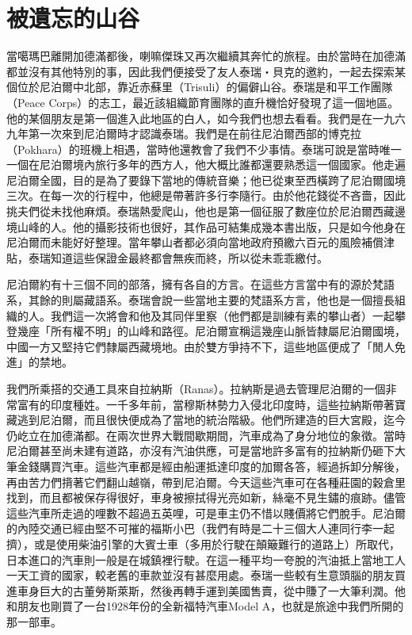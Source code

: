 \chapter{被遺忘的山谷}

當噶瑪巴離開加德滿都後，喇嘛傑珠又再次繼續其奔忙的旅程。由於當時在加德滿都並沒有其他特別的事，因此我們便接受了友人泰瑞‧貝克的邀約，一起去探索某個位於尼泊爾中北部，靠近赤蘇里（Trisuli）的偏僻山谷。泰瑞是和平工作團隊（Peace
Corps）的志工，最近該組織節育團隊的直升機恰好發現了這一個地區。他的某個朋友是第一個進入此地區的白人，如今我們也想去看看。我們是在一九六九年第一次來到尼泊爾時才認識泰瑞。我們是在前往尼泊爾西部的博克拉（Pokhara）的班機上相遇，當時他還教會了我們不少事情。泰瑞可說是當時唯一一個在尼泊爾境內旅行多年的西方人，他大概比誰都還要熟悉這一個國家。他走遍尼泊爾全國，目的是為了要錄下當地的傳統音樂；他已從東至西橫跨了尼泊爾國境三次。在每一次的行程中，他總是帶著許多行李隨行。由於他花錢從不吝嗇，因此挑夫們從未找他麻煩。泰瑞熱愛爬山，他也是第一個征服了數座位於尼泊爾西藏邊境山峰的人。他的攝影技術也很好，其作品可結集成幾本書出版，只是如今他身在尼泊爾而未能好好整理。當年攀山者都必須向當地政府預繳六百元的風險補償津貼，泰瑞知道這些保證金最終都會無疾而終，所以從未乖乖繳付。

尼泊爾約有十三個不同的部落，擁有各自的方言。在這些方言當中有的源於梵語系，其餘的則屬藏語系。泰瑞會說一些當地主要的梵語系方言，他也是一個擅長組織的人。我們這一次將會和他及其同伴里察（他們都是訓練有素的攀山者）一起攀登幾座「所有權不明」的山峰和路徑。尼泊爾宣稱這幾座山脈皆隸屬尼泊爾國境，中國一方又堅持它們隸屬西藏境地。由於雙方爭持不下，這些地區便成了「閒人免進」的禁地。


我們所乘搭的交通工具來自拉納斯（Ranas）。拉納斯是過去管理尼泊爾的一個非常富有的印度種姓。一千多年前，當穆斯林勢力入侵北印度時，這些拉納斯帶著寶藏逃到尼泊爾，而且很快便成為了當地的統治階級。他們所建造的巨大宮殿，迄今仍屹立在加德滿都。在兩次世界大戰間歇期間，汽車成為了身分地位的象徵。當時尼泊爾甚至尚未建有道路，亦沒有汽油供應，可是當地許多富有的拉納斯仍砸下大筆金錢購買汽車。這些汽車都是經由船運抵達印度的加爾各答，經過拆卸分解後，再由苦力們揹著它們翻山越嶺，帶到尼泊爾。今天這些汽車可在各種莊園的穀倉里找到，而且都被保存得很好，車身被擦拭得光亮如新，絲毫不見生鏽的痕跡。儘管這些汽車所走過的哩數不超過五英哩，可是車主仍不惜以賤價將它們脫手。尼泊爾的內陸交通已經由堅不可摧的福斯小巴（我們有時是二十三個大人連同行李一起擠），或是使用柴油引擎的大賓士車（多用於行駛在顛簸難行的道路上）所取代，日本進口的汽車則一般是在城鎮裡行駛。在這一種平均一夸脫的汽油抵上當地工人一天工資的國家，較老舊的車款並沒有甚麼用處。泰瑞一些較有生意頭腦的朋友買進車身巨大的古董勞斯萊斯，然後再轉手運到美國售賣，從中賺了一大筆利潤。他和朋友也剛買了一台1928年份的全新福特汽車Model
A，也就是旅途中我們所開的那一部車。

